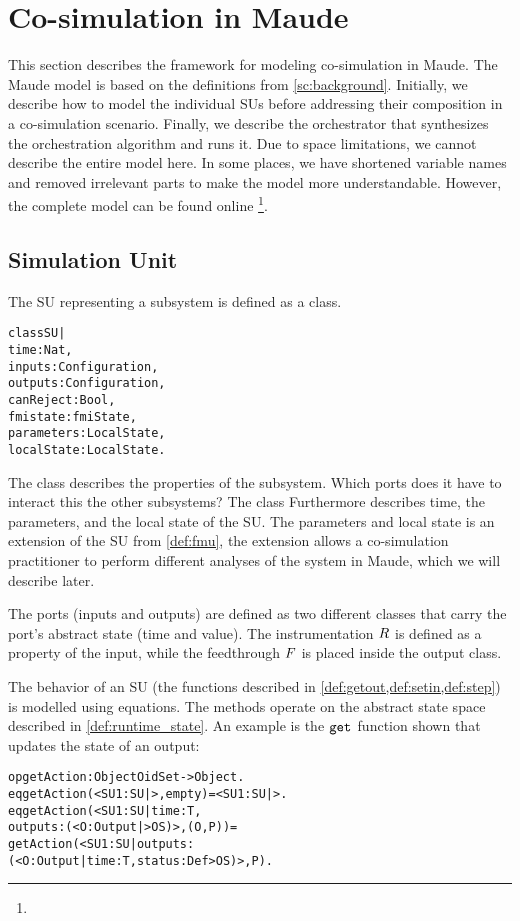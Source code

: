 \section{Co-simulation in Maude}
This section describes the framework for modeling co-simulation in Maude.
The Maude model is based on the definitions from \cref{sc:background}. 
Initially, we describe how to model the individual SUs before addressing their composition in a co-simulation scenario. 
Finally, we describe the orchestrator that synthesizes the orchestration algorithm and runs it.
Due to space limitations, we cannot describe the entire model here. 
In some places, we have shortened variable names and removed irrelevant parts to make the model more understandable.
However, the complete model can be found online \footnote{}.

\subsection{Simulation Unit}
The SU representing a subsystem is defined as a class.
\begin{alltt}
  \small
  class SU |
    time : Nat, 
    inputs : Configuration, 
    outputs : Configuration,
    canReject : Bool, 
    fmistate : fmiState,
    parameters : LocalState,
    localState : LocalState .
  \end{alltt}
The class describes the properties of the subsystem. 
Which ports does it have to interact this the other subsystems?
The class Furthermore describes time, the parameters, and the local state of the SU.
The parameters and local state is an extension of the SU from \cref{def:fmu}, the extension allows a co-simulation practitioner to perform different analyses of the system in Maude, which we will describe later. 

The ports (inputs and outputs) are defined as two different classes that carry the port's abstract state (time and value).
The instrumentation $R$ is defined as a property of the input, while the feedthrough $F$ is placed inside the output class.

The behavior of an SU (the functions described in \cref{def:getout,def:setin,def:step}) is modelled using equations.
The methods operate on the abstract state space described in \cref{def:runtime_state}.
An example is the $\mathtt{get}_{}$ function shown that updates the state of an output:

\begin{alltt}
  \small
  op getAction : Object OidSet -> Object .
  eq getAction(< SU1 : SU | >, empty) = < SU1 : SU | > .
  eq getAction(< SU1 : SU | time : T, 
    outputs : (< O : Output | > OS) >, (O , P)) = 
    getAction(< SU1 : SU | outputs : 
    (< O : Output | time : T, status : Def > OS) >, P) .
\end{alltt}

